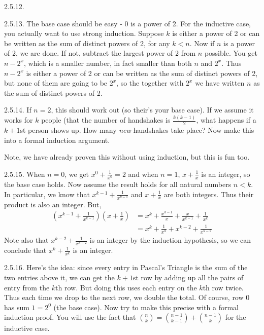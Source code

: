 \begin {itemize}
\begin{ans}{2.5.12.}
\end{ans}
\begin{ans}{2.5.13.}
		The base case should be easy - 0 is a power of 2.  For the inductive case, you actually want to use strong induction.  Suppose $k$ is either a power of 2 or can be written as the sum of distinct powers of 2, for any $k < n$.  Now if $n$ is a power of 2, we are done.  If not, subtract the largest power of 2 from $n$ possible.  You get $n - 2^x$, which is a smaller number, in fact smaller than both $n$ and $2^x$.  Thus $n-2^x$ is either a power of 2 or can be written as the sum of distinct powers of 2, but none of them are going to be $2^x$, so the together with $2^x$ we have written $n$ as the sum of distinct powers of 2.
	
\end{ans}
\begin{ans}{2.5.14.}
	  If $n = 2$, this should work out (so their's your base case).  If we assume it works for $k$ people (that the number of handshakes is $\frac{k(k-1)}{2}$, what happens if a $k+1$st person shows up.  How many {\em new} handshakes take place?  Now make this into a formal induction argument.

	  Note, we have already proven this without using induction, but this is fun too.
	
\end{ans}
\begin{ans}{2.5.15.}
		When $n = 0$, we get $x^0 +\frac{1}{x^0} = 2$ and when $n = 1$, $x + \frac{1}{x}$ is an integer, so the base case holds.  Now assume the result holds for all natural numbers $n < k$.  In particular, we know that $x^{k-1} + \frac{1}{x^{k-1}}$ and $x + \frac{1}{x}$ are both integers.  Thus their product is also an integer.  But,
		\begin{align*}
		\left(x^{k-1} + \frac{1}{x^{k-1}}\right)\left(x + \frac{1}{x}\right) & = x^k + \frac{x^{k-1}}{x} + \frac{x}{x^{k-1}} + \frac{1}{x^k}\\
		& = x^k + \frac{1}{x^k} + x^{k-2} + \frac{1}{x^{k-2}}
		\end{align*}
		Note also that $x^{k-2} + \frac{1}{x^{k-2}}$ is an integer by the induction hypothesis, so we can conclude that $x^k + \frac{1}{x^k}$ is an integer.


	
\end{ans}
\begin{ans}{2.5.16.}
		Here's the idea: since every entry in Pascal's Triangle is the sum of the two entries above it, we can get the $k+1$st row by adding up all the pairs of entry from the $k$th row.  But doing this uses each entry on the $k$th row twice.  Thus each time we drop to the next row, we double the total.  Of course, row 0 has sum $1 = 2^0$ (the base case).  Now try to make this precise with a formal induction proof.  You will use the fact that ${n \choose k} = {n-1 \choose k-1} + {n-1 \choose k}$ for the inductive case.
	

\end{ans}
\end{itemize}
